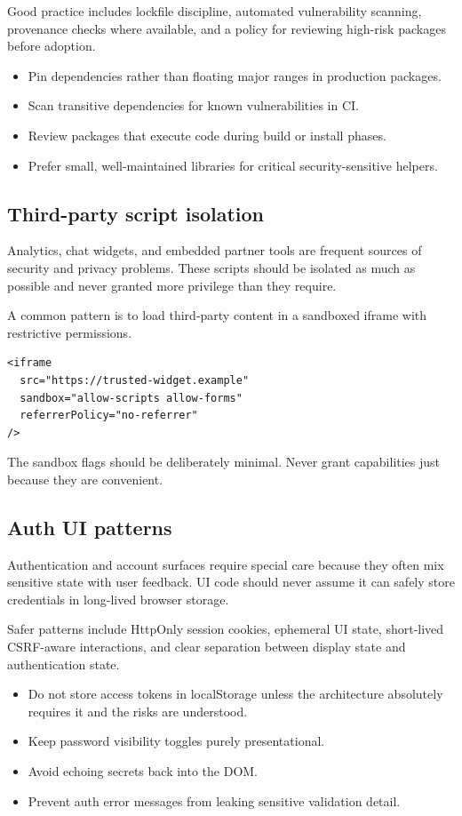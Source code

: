 Good practice includes lockfile discipline, automated vulnerability scanning, provenance checks where available, and a policy for reviewing high-risk packages before adoption.

\begin{itemize}[leftmargin=*, itemsep=0.35em]
  \item Pin dependencies rather than floating major ranges in production packages.
  \item Scan transitive dependencies for known vulnerabilities in CI.
  \item Review packages that execute code during build or install phases.
  \item Prefer small, well-maintained libraries for critical security-sensitive helpers.
\end{itemize}

\subsection{Third-party script isolation}
Analytics, chat widgets, and embedded partner tools are frequent sources of security and privacy problems. These scripts should be isolated as much as possible and never granted more privilege than they require.

A common pattern is to load third-party content in a sandboxed iframe with restrictive permissions.

\begin{verbatim}
<iframe
  src="https://trusted-widget.example"
  sandbox="allow-scripts allow-forms"
  referrerPolicy="no-referrer"
/>
\end{verbatim}

The sandbox flags should be deliberately minimal. Never grant capabilities just because they are convenient.

\subsection{Auth UI patterns}
Authentication and account surfaces require special care because they often mix sensitive state with user feedback. UI code should never assume it can safely store credentials in long-lived browser storage.

Safer patterns include HttpOnly session cookies, ephemeral UI state, short-lived CSRF-aware interactions, and clear separation between display state and authentication state.

\begin{itemize}[leftmargin=*, itemsep=0.35em]
  \item Do not store access tokens in localStorage unless the architecture absolutely requires it and the risks are understood.
  \item Keep password visibility toggles purely presentational.
  \item Avoid echoing secrets back into the DOM.
  \item Prevent auth error messages from leaking sensitive validation detail.
\end{itemize}

